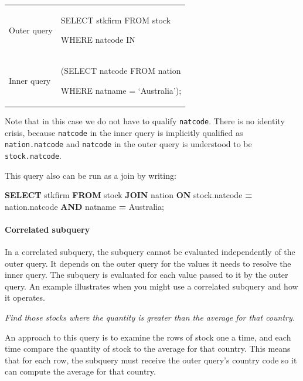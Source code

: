 \documentclass[
]{article}
\newenvironment{Shaded}{\begin{snugshade}}{\end{snugshade}}
\newcommand{\KeywordTok}[1]{\textcolor[rgb]{0.13,0.29,0.53}{\textbf{#1}}}
\newcommand{\NormalTok}[1]{#1}
\newcommand{\OperatorTok}[1]{\textcolor[rgb]{0.81,0.36,0.00}{\textbf{#1}}}
\newcommand{\StringTok}[1]{\textcolor[rgb]{0.31,0.60,0.02}{#1}}
\begin{document}
\begin{longtable}[]{@{}
  >{\raggedright\arraybackslash}p{}
  >{\raggedright\arraybackslash}p{}@{}}
\toprule
\endhead
Outer query & SELECT stkfirm FROM stock

WHERE natcode IN \\
Inner query & (SELECT natcode FROM nation

WHERE natname = `Australia'); \\
\bottomrule
\end{longtable}

Note that in this case we do not have to qualify \texttt{natcode}. There is no
identity crisis, because \texttt{natcode} in the inner query is implicitly
qualified as \texttt{nation.natcode} and \texttt{natcode} in the outer query is
understood to be \texttt{stock.natcode}.

This query also can be run as a join by writing:

\begin{Shaded}
\begin{Highlighting}[]
\KeywordTok{SELECT}\NormalTok{ stkfirm }\KeywordTok{FROM}\NormalTok{ stock }\KeywordTok{JOIN}\NormalTok{ nation}
    \KeywordTok{ON}\NormalTok{ stock.natcode }\OperatorTok{=}\NormalTok{ nation.natcode}
    \KeywordTok{AND}\NormalTok{ natname }\OperatorTok{=} \StringTok{\textquotesingle{}Australia\textquotesingle{}}\NormalTok{;}
\end{Highlighting}
\end{Shaded}

\hypertarget{correlated-subquery}{%
\paragraph*{Correlated subquery}\label{correlated-subquery}}

In a correlated subquery, the subquery cannot be evaluated independently
of the outer query. It depends on the outer query for the values it
needs to resolve the inner query. The subquery is evaluated for each
value passed to it by the outer query. An example illustrates when you
might use a correlated subquery and how it operates.

\emph{Find those stocks where the quantity is greater than the average for
that country.}

An approach to this query is to examine the rows of stock one a time,
and each time compare the quantity of stock to the average for that
country. This means that for each row, the subquery must receive the
outer query's country code so it can compute the average for that
country.
\end{document}

